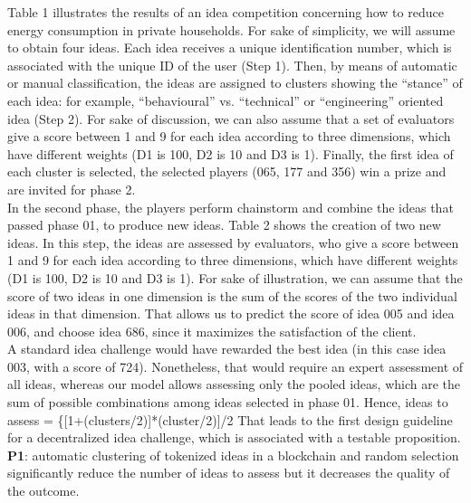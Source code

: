 \documentclass[]{elsarticle} %
\begin{document}
Table 1 illustrates the results of an idea competition concerning how to
reduce energy consumption in private households. For sake of simplicity,
we will assume to obtain four ideas. Each idea receives a unique
identification number, which is associated with the unique ID of the
user (Step 1). Then, by means of automatic or manual classification, the
ideas are assigned to clusters showing the ``stance'' of each idea: for
example, ``behavioural'' vs. ``technical'' or ``engineering'' oriented
idea (Step 2). For sake of discussion, we can also assume that a set of
evaluators give a score between 1 and 9 for each idea according to three
dimensions, which have different weights (D1 is 100, D2 is 10 and D3 is
1). Finally, the first idea of each cluster is selected, the selected
players (065, 177 and 356) win a prize and are invited for phase 2.\\
In the second phase, the players perform chainstorm and combine the
ideas that passed phase 01, to produce new ideas. Table 2 shows the
creation of two new ideas. In this step, the ideas are assessed by
evaluators, who give a score between 1 and 9 for each idea according to
three dimensions, which have different weights (D1 is 100, D2 is 10 and
D3 is 1). For sake of illustration, we can assume that the score of two
ideas in one dimension is the sum of the scores of the two individual
ideas in that dimension. That allows us to predict the score of idea 005
and idea 006, and choose idea 686, since it maximizes the satisfaction
of the client.\\
A standard idea challenge would have rewarded the best idea (in this
case idea 003, with a score of 724). Nonetheless, that would require an
expert assessment of all ideas, whereas our model allows assessing only
the pooled ideas, which are the sum of possible combinations among ideas
selected in phase 01. Hence, ideas to assess =
\{{[}1+(clusters/2){]}*(cluster/2){]}/2 That leads to the first design
guideline for a decentralized idea challenge, which is associated with a
testable proposition.\\
\textbf{P1}: automatic clustering of tokenized ideas in a blockchain and
random selection significantly reduce the number of ideas to assess but
it decreases the quality of the outcome.
\end{document}
